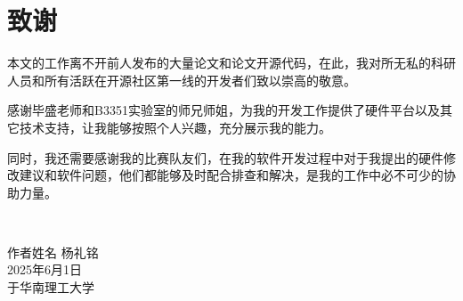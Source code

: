 \chapter{致\texorpdfstring{\quad}{}谢}
\begin{flushleft}
本文的工作离不开前人发布的大量论文和论文开源代码，在此，我对所无私的科研人员和所有活跃在开源社区第一线的开发者们致以崇高的敬意。

感谢毕盛老师和B3351实验室的师兄师姐，为我的开发工作提供了硬件平台以及其它技术支持，让我能够按照个人兴趣，充分展示我的能力。

同时，我还需要感谢我的比赛队友们，在我的软件开发过程中对于我提出的硬件修改建议和软件问题，他们都能够及时配合排查和解决，是我的工作中必不可少的协助力量。
\end{flushleft}

~\\

\begin{minipage}[t]{0.945\textwidth}%
	\begin{flushright}
		作者姓名  杨礼铭\\
		2025年6月1日\\	%
		于华南理工大学
		\par\end{flushright}
\end{minipage}